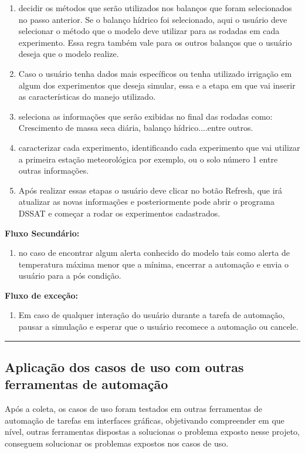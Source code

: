 \documentclass[12pt]{article}
\begin{document}
\begin{enumerate}
		\item decidir os métodos que serão utilizados nos balanços que foram selecionados no passo anterior. Se o balanço hídrico foi selecionado, aqui o usuário deve selecionar o método que o modelo deve utilizar para as rodadas em cada experimento. Essa regra também vale para os outros balanços que o usuário deseja que o modelo realize.
		\item Caso o usuário tenha dados mais específicos ou tenha utilizado irrigação em algum dos experimentos que deseja simular, essa e a etapa em que vai inserir as características do manejo utilizado. 
		\item seleciona as informações que serão exibidas no final das rodadas como: Crescimento de massa seca diária, balanço hídrico....entre outros.
		\item caracterizar cada experimento, identificando cada experimento que vai utilizar a primeira estação meteorológica por exemplo, ou o solo número 1 entre outras informações.
		\item Após realizar essas etapas o usuário deve clicar no botão Refresh, que irá atualizar as novas informações e posteriormente pode abrir o programa DSSAT e começar a rodar os experimentos cadastrados.
	\end{enumerate}
	
	{\bf Fluxo Secundário:}
	
	\begin{enumerate}
		\item no caso de encontrar algum alerta conhecido do modelo tais como alerta de temperatura máxima menor que a mínima, encerrar a automação e envia o usuário para a pós condição.
	\end{enumerate}
		
	{\bf Fluxo de exceção:}
	
	\begin{enumerate}
		\item Em caso de qualquer interação do usuário durante a tarefa de automação, pausar a simulação e esperar que o usuário recomece a automação ou cancele.
	\end{enumerate}
	
	\bigskip \hrule \bigskip
	
	\subsection {Aplicação dos casos de uso com outras ferramentas de automação}

	Após a coleta, os casos de uso foram testados em outras ferramentas de automação de tarefas em interfaces gráficas, objetivando compreender em que nível, outras ferramentas dispostas a solucionas o problema exposto nesse projeto, conseguem solucionar os problemas expostos nos casos de uso.
	
\end{document}
